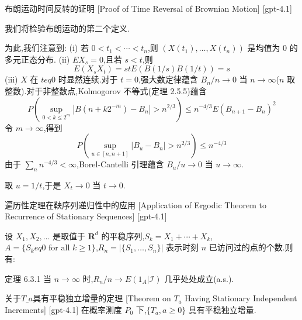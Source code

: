 \documentclass[UTF8]{ctexart}
\begin{document}
    
    
    \begin{prf}
        {布朗运动时间反转的证明}
        [Proof of Time Reversal of Brownian Motion]
        [gpt-4.1]
        
我们将检验布朗运动的第二个定义.

为此,我们注意到:
(i) 若 $0 < t_1 < \cdots < t_n$,则 $(X(t_1),\ldots,X(t_n))$ 是均值为 0 的多元正态分布.
(ii) $E X_s = 0$,且若 $s<t$,则
\[
E(X_s X_t) = s t E(B(1/s) B(1/t)) = s
\]
(iii) $X$ 在 $t 
eq 0$ 时显然连续.对于 $t=0$,强大数定律蕴含 $B_n/n \to 0$ 当 $n \to \infty$($n$ 取整数).对于非整数点,Kolmogorov 不等式(定理 2.5.5)蕴含
\[
P \left( \sup_{0 < k \le 2^m} | B(n + k 2^{-m}) - B_n | > n^{2/3} \right) \le n^{-4/3} E ( B_{n+1} - B_n )^{2}
\]
令 $m \to \infty$,得到
\[
P \left( \sup_{u \in [n, n+1]} | B_u - B_n | > n^{2/3} \right) \leq n^{-4/3}
\]
由于 $\sum_{n} n^{-4/3} < \infty$,Borel-Cantelli 引理蕴含 $B_u/u \to 0$ 当 $u \to \infty$.

取 $u=1/t$,于是 $X_t \to 0$ 当 $t \to 0$.

    \end{prf}
    
    
    
    \begin{thm}
        {遍历性定理在鞅序列递归性中的应用}
        [Application of Ergodic Theorem to Recurrence of Stationary Sequences]
        [gpt-4.1]
        
设 $X_1, X_2, \dots$ 是取值于 $\mathbf{R}^d$ 的平稳序列,$S_k = X_1 + \cdots + X_k$,$A = \{ S_k 
eq 0 \text{ for all } k \geq 1 \}$,$R_n = |\{ S_1, \ldots, S_n\}|$ 表示时刻 $n$ 已访问过的点的个数.则有:

定理 6.3.1 当 $n \to \infty$ 时,$R_n / n \to E(1_A | \mathcal{I})$ 几乎处处成立(a.s.).

    \end{thm}
    
    
    
    \begin{thm}
        {关于$T\_a$具有平稳独立增量的定理}
        [Theorem on $T_a$ Having Stationary Independent Increments]
        [gpt-4.1]
        在概率测度 $P_0$ 下,$\{T_a, a \ge 0\}$ 具有平稳独立增量.
    \end{thm}
    
    
    
\end{document}
